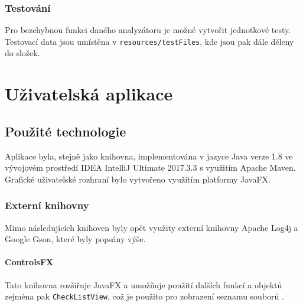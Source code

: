 	    	\subsubsection{Testování}
	    		Pro bezchybnou funkci daného analyzátoru je možné vytvořit jednotkové testy. Testovací data jsou umístěna v \texttt{resources/testFiles}, kde jsou pak dále děleny do složek.

    
    
    
    
	\section{Uživatelská aplikace}
	   \subsection{Použité technologie}
	    	 Aplikace byla, stejně jako knihovna, implementována v jazyce Java verze 1.8 ve vývojovém prostředí IDEA IntelliJ Ultimate 2017.3.3 s využitím Apache Maven. Grafické uživatelské rozhraní bylo vytvořeno využitím platformy JavaFX. 
	    	 
	    	 \subsubsection{Externí knihovny}
				Mimo následujících knihoven byly opět využity externí knihovny Apache Log4j a Google Gson, které byly popsány výše.
			
			\paragraph{ControlsFX} 
				Tato knihovna rozšiřuje JavaFX a umožňuje použití dalších funkcí a objektů zejména pak \texttt{CheckListView}, což je použito pro zobrazení seznamu souborů \cite{controlsfx}. 
			
